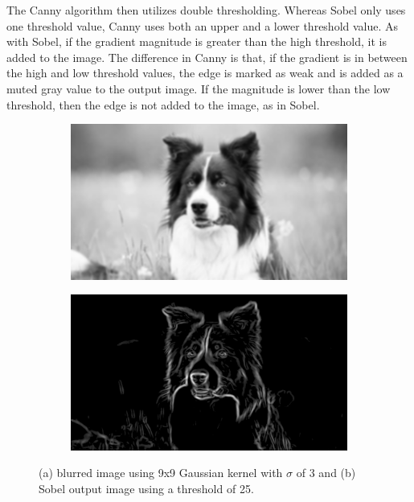 \documentclass[12pt]{article}
\begin{document}
			The Canny algorithm then utilizes double thresholding. Whereas Sobel only uses one threshold value, Canny uses both an upper and a lower threshold value. As with Sobel, if the gradient magnitude is greater than the high threshold, it is added to the image. The difference in Canny is that, if the gradient is in between the high and low threshold values, the edge is marked as weak and is added as a muted gray value to the output image. If the magnitude is lower than the low threshold, then the edge is not added to the image, as in Sobel.

			\begin{figure}[H]
				\centering
				\begin{subfigure}[b]{0.45\linewidth}
					\includegraphics[width=1\linewidth,keepaspectratio]{../examples/dog/dog_gaussian-9x9}
					\subcaption{}
					\label{fig:sobel_blur}
				\end{subfigure} %
				\begin{subfigure}[b]{0.45\linewidth}
					\includegraphics[width=1\linewidth,keepaspectratio]{../examples/dog/dog_gaussian-9x9_thresh-25}
					\subcaption{}
					\label{fig:sobel_out}
				\end{subfigure} %
				\caption{\small (a) blurred image using 9x9 Gaussian kernel with $\sigma$ of 3 and (b) Sobel output image using a threshold of 25.}
				\label{fig:sobel}
			\end{figure} %
\end{document}
